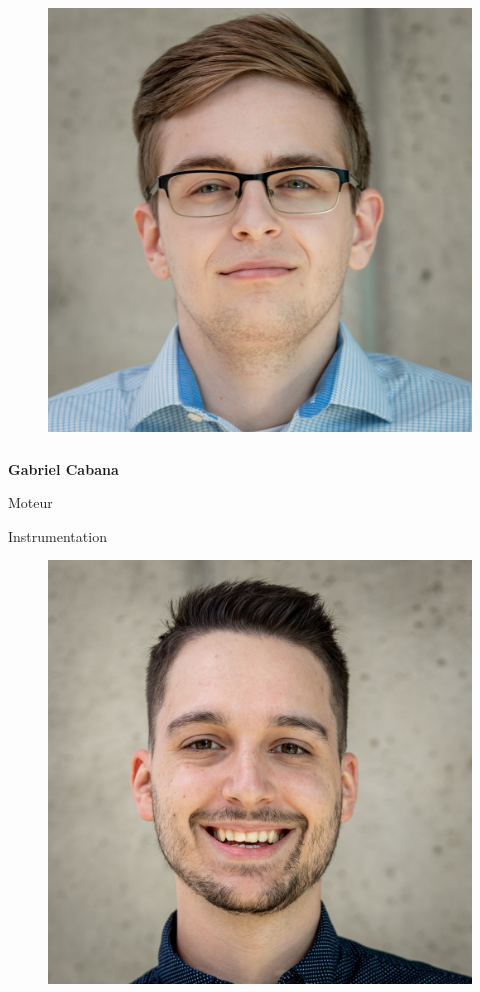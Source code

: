 \documentclass[a0paper,portrait]{baposter}
\begin{document}
\begin{poster}
{\begin{figure}
\includegraphics[width=.9\linewidth]{img/membres/Gabriel-Cabana-2.jpg} 
\end{figure}
\subsubsection*{}
\vspace{-2mm}
\textbf{Gabriel Cabana}

Moteur

Instrumentation


\begin{figure}
\includegraphics[width=.9\linewidth]{img/membres/Jérôme-Gelé-2.jpg} 
\end{figure}
}
\end{poster}
\end{document}
